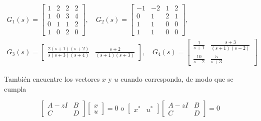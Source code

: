 \documentclass[11pt]{article}
\begin{document}
$$
\begin{gathered}
G_{1}(s)=\left[\begin{array}{ll|ll}
1 & 2 & 2 & 2 \\
1 & 0 & 3 & 4 \\
\hline 0 & 1 & 1 & 2 \\
1 & 0 & 2 & 0
\end{array}\right], \quad G_{2}(s)=\left[\begin{array}{cc|cc}
-1 & -2 & 1 & 2 \\
0 & 1 & 2 & 1 \\
\hline 1 & 1 & 0 & 0 \\
1 & 1 & 0 & 0
\end{array}\right], \\
G_{3}(s)=\left[\begin{array}{ll}
\frac{2(s+1)(s+2)}{s(s+3)(s+4)} & \frac{s+2}{(s+1)(s+3)}
\end{array}\right], \quad G_{4}(s)=\left[\begin{array}{cc}
\frac{1}{s+1} & \frac{s+3}{(s+1)(s-2)} \\
\frac{10}{s-2} & \frac{5}{s+3}
\end{array}\right]
\end{gathered}
$$

También encuentre los vectores $x$ y $u$ cuando corresponda, de modo que se cumpla

$$
\left[\begin{array}{cc}
A-z I & B \\
C & D
\end{array}\right]\left[\begin{array}{l}
x \\
u
\end{array}\right]=0 \text { o }\left[\begin{array}{ll}
x^{*} & u^{*}
\end{array}\right]\left[\begin{array}{cc}
A-z I & B \\
C & D
\end{array}\right]=0
$$
\end{document}
